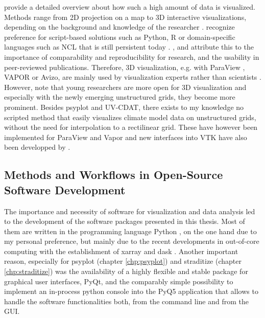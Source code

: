 \begin{refsection}
\cite{RautenhausBoettingerSiemenEtAl2018} provide a detailed overview about how such a high amount of data is visualized. Methods range from 2D projection on a map to 3D interactive visualizations, depending on the background and knowledge of the researcher \citep{Nocke2014}. \cite{NockeSterzelBoettingerEtAl2008} recognize preference for script-based solutions such as Python, R or domain-specific languages such as NCL \citep{BrownBrownriggHaleyEtAl2012} that is still persistent today \citep{RautenhausBoettingerSiemenEtAl2018}. \cite{Nocke2014}, \cite{SchulzNockeHeitzlerEtAl2013} and \cite{RautenhausBoettingerSiemenEtAl2018} attribute this to the importance of comparability and reproducibility for research, and the usability in peer-reviewed publications. Therefore, 3D visualization, e.g. with ParaView \citep{Ayachit2015}, VAPOR \citep{ClyneMininniNortonEtAl2007} or Avizo\addref, are mainly used by visualization experts rather than scientists \citep{NockeSterzelBoettingerEtAl2008}. However, \cite{Nocke2014} note that young researchers are more open for 3D visualization and especially with the newly emerging unstructured grids, they become more prominent. Besides psyplot \citep[chapter \ref{chp:psyplot}]{Sommer2017} and UV-CDAT\addref, there exists to my knowledge no scripted method that easily visualizes climate model data on unstructured grids, without the need for interpolation to a rectilinear grid. These have however been implemented for ParaView \citep{RoeberAdamidisBehrens2015} and Vapor \citep{JubairAlimRoeberEtAl2015} and new interfaces into VTK have also been developped by \cite{SullivanTrainorGuitton2019}.


\subsection{Methods and Workflows in Open-Source Software Development} \label{sec:intro-software-tools}

The importance and necessity of software for visualization and data analysis led to the development of the software packages presented in this thesis. Most of them are written in the programming language Python \citep{PerezGrangerHunter2011}, on the one hand due to my personal preference, but mainly due to the recent developments in out-of-core computing with the establishment of xarray and dask \citep{HoyerHamman2017, DDT2016, Rocklin2015}. Another important reason, especially for psyplot (chapter \ref{chp:psyplot}) and straditize (chapter \ref{chp:straditize}) was the availability of a highly flexible and stable package for graphical user interfaces, PyQt\addref, and the comparably simple possibility to implement an in-process python console into the PyQ5 application  that allows to handle the software functionalities both, from the command line and from the GUI.


\end{refsection}
